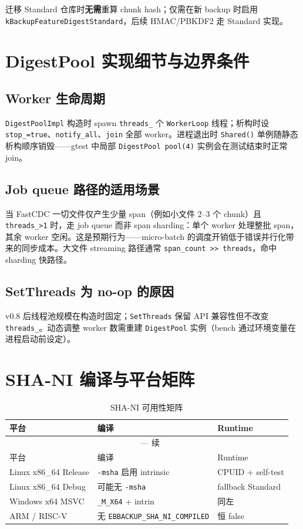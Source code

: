 迁移 Standard 仓库时\textbf{无需}重算 chunk hash；仅需在新 backup 时启用 \texttt{kBackupFeatureDigestStandard}，后续 HMAC/PBKDF2 走 Standard 实现。

\section{DigestPool 实现细节与边界条件}

\subsection{Worker 生命周期}

\texttt{DigestPoolImpl} 构造时 spawn \texttt{threads\_} 个 \texttt{WorkerLoop} 线程；析构时设 \texttt{stop\_=true}、\texttt{notify\_all}、\texttt{join} 全部 worker。进程退出时 \texttt{Shared()} 单例随静态析构顺序销毁——gtest 中局部 \texttt{DigestPool pool(4)} 实例会在测试结束时正常 join。

\subsection{Job queue 路径的适用场景}

当 FastCDC 一切文件仅产生少量 span（例如小文件 2--3 个 chunk）且 \texttt{threads\_>1} 时，走 job queue 而非 span sharding：单个 worker 处理整批 span，其余 worker 空闲。这是预期行为——micro-batch 的调度开销低于错误并行化带来的同步成本。大文件 streaming 路径通常 \texttt{span\_count >> threads}，命中 sharding 快路径。

\subsection{SetThreads 为 no-op 的原因}

v0.8 后线程池规模在构造时固定；\texttt{SetThreads} 保留 API 兼容性但不改变 \texttt{threads\_}。动态调整 worker 数需重建 \texttt{DigestPool} 实例（bench 通过环境变量在进程启动前设定）。

\section{SHA-NI 编译与平台矩阵}

\begin{longtable}{@{}llp{7cm}@{}}
\caption{SHA-NI 可用性矩阵} \\
\toprule
平台 & 编译 & Runtime \\
\midrule
\endfirsthead
\multicolumn{3}{c}{\tablename\ \thetable{} — 续} \\
\toprule
平台 & 编译 & Runtime \\
\midrule
\endhead
Linux x86\_64 Release & \texttt{-msha} 启用 intrinsic & CPUID + self-test \\
Linux x86\_64 Debug & 可能无 \texttt{-msha} & fallback Standard \\
Windows x64 MSVC & \texttt{\_M\_X64} + intrin & 同左 \\
ARM / RISC-V & 无 \texttt{EBBACKUP\_SHA\_NI\_COMPILED} & 恒 false \\
\bottomrule
\end{longtable}

